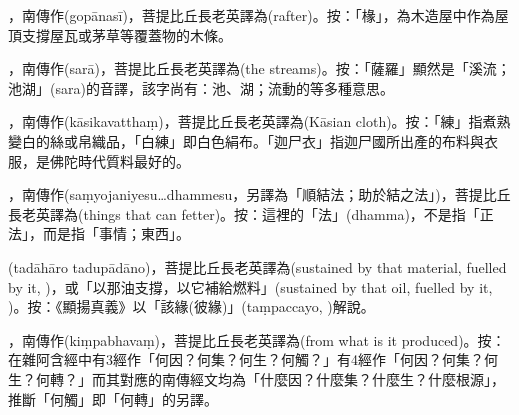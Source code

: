 \startitemgroup[noteitems]
\item{}，南傳作(gopānasī)，菩提比丘長老英譯為(rafter)。按：「椽」，為木造屋中作為屋頂支撐屋瓦或茅草等覆蓋物的木條。
\stopitemgroup

\startitemgroup[noteitems]
\item{}，南傳作(sarā)，菩提比丘長老英譯為(the streams)。按：「薩羅」顯然是「溪流；池湖」(sara)的音譯，該字尚有：池、湖；流動的等多種意思。
\stopitemgroup

\startitemgroup[noteitems]
\item{}，南傳作(kāsikavatthaṃ)，菩提比丘長老英譯為(Kāsian cloth)。按：「練」指煮熟變白的絲或帛織品，「白練」即白色絹布。「迦尸衣」指迦尸國所出產的布料與衣服，是佛陀時代質料最好的。
\stopitemgroup

\startitemgroup[noteitems]
\item{}，南傳作(saṃyojaniyesu…dhammesu，另譯為「順結法；助於結之法」)，菩提比丘長老英譯為(things that can fetter)。按：這裡的「法」(dhamma)，不是指「正法」，而是指「事情；東西」。
\stopitemgroup

\startitemgroup[noteitems]
\item{}(tadāhāro tadupādāno)，菩提比丘長老英譯為(sustained by that material, fuelled by it, )，或「以那油支撐，以它補給燃料」(sustained by that oil, fuelled by it, )。按：《顯揚真義》以「該緣(彼緣)」(taṃpaccayo, )解說。
\stopitemgroup

\startitemgroup[noteitems]
\item{}，南傳作(kiṃpabhavaṃ)，菩提比丘長老英譯為(from what is it produced)。按：在雜阿含經中有3經作「何因？何集？何生？何觸？」有4經作「何因？何集？何生？何轉？」而其對應的南傳經文均為「什麼因？什麼集？什麼生？什麼根源」，推斷「何觸」即「何轉」的另譯。
\stopitemgroup

